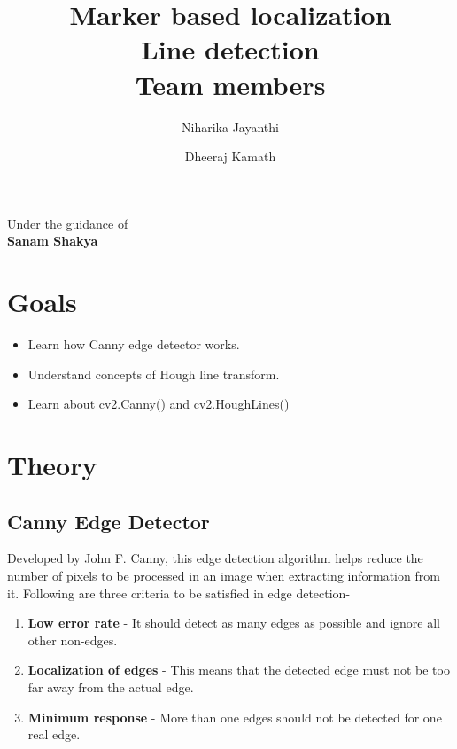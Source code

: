 \documentclass[]{article}
\date{}
\title {Marker based localization \\ [10pt]
	Line detection  \\[25pt] Team members }
\author {Niharika Jayanthi \and Dheeraj Kamath}
\providecommand{\tightlist}{%
  \setlength{\itemsep}{0pt}\setlength{\parskip}{0pt}}
\begin{document}
\maketitle
\begin{center}
	\begin{large}
		Under the guidance of\\
		\textbf{Sanam Shakya}\\
		\vspace{0.5in}
	\end{large}
\end{center}
\section{Goals}\label{goals}

\begin{itemize}
\tightlist
\item
  Learn how Canny edge detector works.
\item
  Understand concepts of Hough line transform.
\item
  Learn about cv2.Canny() and cv2.HoughLines()
\end{itemize}

\section{Theory}\label{theory}

\subsection{Canny Edge Detector}\label{canny-edge-detector}

Developed by John F. Canny, this edge detection algorithm helps reduce
the number of pixels to be processed in an image when extracting
information from it. Following are three criteria to be satisfied in
edge detection-

\begin{enumerate}
\def\labelenumi{\arabic{enumi}.}
\tightlist
\item
  \textbf{Low error rate} - It should detect as many edges as possible
  and ignore all other non-edges.
\item
  \textbf{Localization of edges} - This means that the detected edge
  must not be too far away from the actual edge.
\item
  \textbf{Minimum response} - More than one edges should not be detected
  for one real edge.
\end{enumerate}
\end{document}
